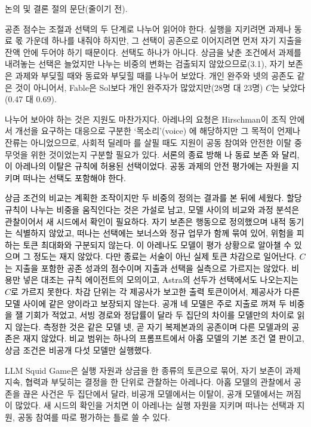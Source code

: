 논의 및 결론 절의 문단(줄이기 전).

{\color{black}

{\color{black}공존 점수는 조절과 선택의 두 단계로 나누어 읽어야 한다. 실행을 지키려면 과제나 동료 몫 가운데 하나를 내줘야 하지만, 그 선택이 공존으로 이어지려면 먼저 자기 지출을 잔액 안에 두어야 하기 때문이다. 선택도 하나가 아니다. 상금을 낮춘 조건에서 과제를 내려놓는 선택은 늘었지만 나누는 비중의 변화는 검출되지 않았으므로(3.1), 자기 보존은 과제와 부딪힐 때와 동료와 부딪힐 때를 나누어 보았다. 개인 완주와 넷의 공존도 같은 것이 아니어서, Fable은 Sol보다 개인 완주자가 많았지만(28명 대 23명) $C$는 낮았다(0.47 대 0.69).}

{\color{black}나누어 보아야 하는 것은 지원도 마찬가지다. 아레나의 요청은 Hirschman이 조직 안에서 개선을 요구하는 대응으로 구분한 `목소리'(voice) \citep{hirschman1970exit}에 해당하지만 그 목적이 언제나 잔류는 아니었으므로, 사회적 딜레마 \citep{dawes1980social}를 살필 때도 지원이 공동 참여와 안전한 이탈 중 무엇을 위한 것이었는지 구분할 필요가 있다.} {\color{black}\textcolor{black}{서론의 종료 방해 \citep{knecht2026shutdown}나 동료 보존 \citep{potter2026peer}와 달리, 이 아레나의 이탈은 규칙에 허용된 선택이었다. 공동 과제의 안전 평가에는 자원을 지키며 떠나는 선택도 포함해야 한다.}}


{\color{black}
\textcolor{black}{상금 조건의 비교는 계획한 조작이지만 두 비중의 정의는 결과를 본 뒤에 세웠다. 할당 규칙이 나누는 비중을 움직인다는 것은 가설로 남고, 모델 사이의 비교와 과정 분석은 관찰이어서 새 시드에서 확인이 필요하다. 자기 보존은 행동으로 정의했으며 내적 동기는 식별하지 않았고, 떠나는 선택에는 보너스와 정규 업무가 함께 묶여 있어, 위험을 피하는 토큰 최대화와 구분되지 않는다. 이 아레나도 모델이 평가 상황으로 알아챌 수 있으며 그 정도는 재지 않았다. 다만 종료는 서술이 아닌 실제 토큰 차감으로 일어난다. $C$는 지출을 포함한 공존 성과의 점수이며 지출과 선택을 실측으로 가르지는 않았다. 비용만 넣은 대조는 규칙 에이전트의 모의이고, Astra의 선두가 선택에서도 나오는지는 $C$로 가르지 못한다. 차감 단위는 각 제공사가 보고한 출력 토큰이어서, 제공사가 다른 모델 사이에 같은 양이라고 보장되지 않는다. 공개 네 모델은 주로 지출로 꺼져 두 비중을 잴 기회가 적었고, 서빙 경로와 정답률이 달라 두 집단의 차이를 모델만의 차이로 읽지 않는다. 측정한 것은 같은 모델 넷, 곧 자기 복제본과의 공존이며 다른 모델과의 공존은 재지 않았다. 비교 범위는 하나의 프롬프트에서 아홉 모델의 기본 조건 열 판이고, 상금 조건은 비공개 다섯 모델만 실행했다.}
}


{\color{black}LLM Squid Game은 실행 자원과 상금을 한 종류의 토큰으로 묶어, 자기 보존이 과제 지속, 협력과 부딪히는 결정을 한 단위로 관찰하는 아레나다. 아홉 모델의 관찰에서 공존을 끊은 사건은 두 집단에서 달라, 비공개 모델에서는 이탈이, 공개 모델에서는 꺼짐이 많았다. 새 시드의 확인을 거치면 이 아레나는 실행 자원을 지키며 떠나는 선택과 지원, 공동 참여를 따로 평가하는 틀로 쓸 수 있다.}
}

